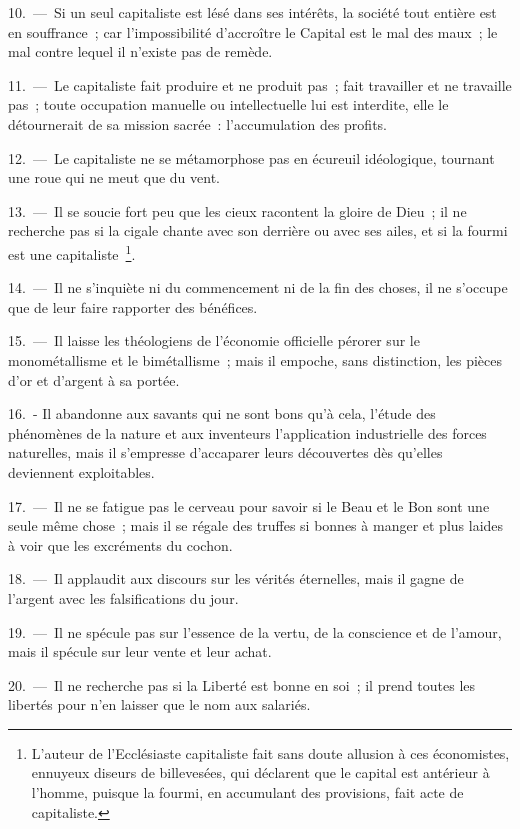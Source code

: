 \documentclass[french,twoside]{book} %
\begin{document}
10. — Si un seul capitaliste est lésé dans ses intérêts, la société tout entière est en souffrance ; car l’impossibilité d’accroître le Capital est le mal des maux ; le mal contre lequel il n’existe pas de remède.\par
11. — Le capitaliste fait produire et ne produit pas ; fait travailler et ne travaille pas ; toute occupation manuelle ou intellectuelle lui est interdite, elle le détournerait de sa mission sacrée : l’accumulation des profits.\par
12. — Le capitaliste ne se métamorphose pas en écureuil idéologique, tournant une roue qui ne meut que du vent.\par
13. — Il se soucie fort peu que les cieux racontent la gloire de Dieu ; il ne recherche pas si la cigale chante avec son derrière ou avec ses ailes, et si la fourmi est une capitaliste \footnote{L'auteur de l’Ecclésiaste capitaliste fait sans doute allusion à ces économistes, ennuyeux diseurs de billevesées, qui déclarent que le capital est antérieur à l’homme, puisque la fourmi, en accumulant des provisions, fait acte de capitaliste.}.\par
14. — Il ne s’inquiète ni du commencement ni de la fin des choses, il ne s’occupe que de leur faire rapporter des bénéfices.\par
15. — Il laisse les théologiens de l’économie officielle pérorer sur le monométallisme et le bimétallisme ; mais il empoche, sans distinction, les pièces d’or et d’argent à sa portée.\par
16. - Il abandonne aux savants qui ne sont bons qu’à cela, l’étude des phénomènes de la nature et aux inventeurs l’application industrielle des forces naturelles, mais il s’empresse d’accaparer leurs découvertes dès qu’elles deviennent exploitables.\par
17. — Il ne se fatigue pas le cerveau pour savoir si le Beau et le Bon sont une seule même chose ; mais il se régale des truffes si bonnes à manger et plus laides à voir que les excréments du cochon.\par
18. — Il applaudit aux discours sur les vérités éternelles, mais il gagne de l’argent avec les falsifications du jour.\par
19. — Il ne spécule pas sur l’essence de la vertu, de la conscience et de l’amour, mais il spécule sur leur vente et leur achat.\par
20. — Il ne recherche pas si la Liberté est bonne en soi ; il prend toutes les libertés pour n’en laisser que le nom aux salariés.\par
\end{document}
